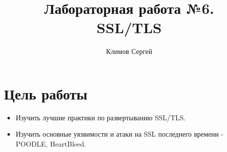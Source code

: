 \documentclass[10pt,a4paper]{report}
\author{Климов Сергей}
\title{Лабораторная работа №6.\\
	SSL/TLS}
\begin{document}
	\maketitle
	\renewcommand{\thesection}{\arabic{section}}
	\tableofcontents
	\pagebreak
	
	\setcounter{totalnumber}{10}
	\setcounter{topnumber}{10}
	\setcounter{bottomnumber}{10}
	\renewcommand{\topfraction}{1}
	\renewcommand{\textfraction}{0}
	
	\section{Цель работы}
	\begin{itemize}
		\item Изучить лучшие практики по развертыванию SSL/TLS.
		\item Изучить основные уязвимости и атаки на SSL последнего времени - POODLE, HeartBleed.
	\end{itemize}
	
\end{document}
